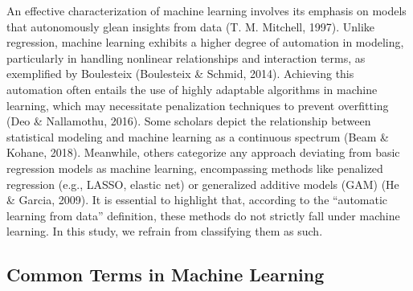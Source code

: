 \documentclass[
  man]{apa7}
\begin{document}
An effective characterization of machine learning involves its emphasis on models that autonomously glean insights from data (T. M. Mitchell, 1997).
Unlike regression, machine learning exhibits a higher degree of automation in modeling, particularly in handling nonlinear relationships and interaction terms, as exemplified by Boulesteix (Boulesteix \& Schmid, 2014).
Achieving this automation often entails the use of highly adaptable algorithms in machine learning, which may necessitate penalization techniques to prevent overfitting (Deo \& Nallamothu, 2016).
Some scholars depict the relationship between statistical modeling and machine learning as a continuous spectrum (Beam \& Kohane, 2018).
Meanwhile, others categorize any approach deviating from basic regression models as machine learning, encompassing methods like penalized regression (e.g., LASSO, elastic net) or generalized additive models (GAM) (He \& Garcia, 2009).
It is essential to highlight that, according to the ``automatic learning from data'' definition, these methods do not strictly fall under machine learning.
In this study, we refrain from classifying them as such.

\subsection{Common Terms in Machine Learning}\label{common-terms-in-machine-learning}
\end{document}
